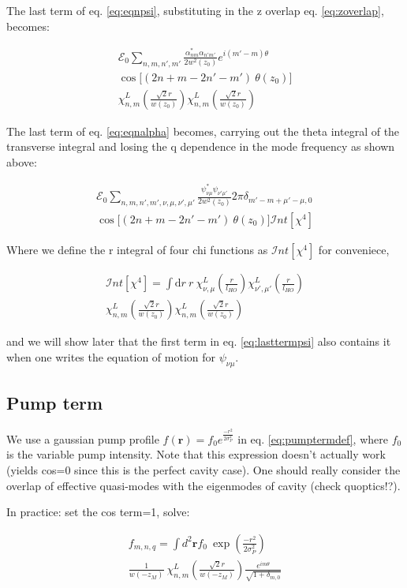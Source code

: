 \documentclass[a4paper,twocolumn,nobalancelastpage]{revtex4-1}
\newcommand{\vect}[1]{\mathbf{#1}}
\newcommand{\lho}{l_{HO}}
\newcommand{\wzsq}{w^2(z_0)}
\newcommand{\af}{\psi_{\nu\mu}}
\newcommand{\afp}{\psi_{\nu'\mu'}}
\newcommand{\lf}{\alpha_{nm}}
\newcommand{\lfp}{\alpha_{n'm'}}
\newcommand{\chiaf}{\chi_{\nu,\mu}^L\left(\frac{r}{\lho}\right)}
\newcommand{\chiafp}{\chi_{\nu',\mu'}^L\left(\frac{r}{\lho}\right)}
\newcommand{\chilf}{\chi_{n,m}^L\left(\frac{\sqrt{2}r}{w(z_0)}\right)}
\newcommand{\chilfp}{\chi_{n,m}^L\left(\frac{\sqrt{2}r}{w(z_0)}\right)}
\newcommand{\intfour}{\mathcal{I}nt[\chi^4]}
\begin{document}
The last term of eq. \eqref{eq:eqnpsi}, substituting in the z overlap eq. \eqref{eq:zoverlap}, becomes:

\begin{multline}
\label{eq:lasttermpsi}
\mathcal{E}_0 \sum_{n,m,n',m'} \frac{\lf^* \lfp}{2 \wzsq} e^{i(m'-m)\theta} 
\\ \cos \big[(2n+m-  2n'-m') 
\ \theta(z_0)\big] \\ \chilf \chilfp
\end{multline}

The last term of eq. \eqref{eq:eqnalpha} becomes, carrying out the theta integral of the transverse integral and losing the q dependence in the mode frequency as shown above:

\begin{multline}
\label{eq:lasttermalpha}
\mathcal{E}_0 \sum_{n,m,n',m', \nu, \mu, \nu',\mu'} \frac{\af^* \afp}{2 \wzsq}
2 \pi \delta_{m'-m+\mu'-\mu,0}\\
\cos \big[(2n+m-  2n'-m') 
\ \theta(z_0)\big] \intfour
\end{multline}

Where we define the r integral of four chi functions as $\mathcal{I}nt[\chi^4]$ for conveniece,

\begin{multline}
\label{eq:intfour}
\mathcal{I}nt[\chi^4]=\int \mathrm{d}r \ r \  \chiaf \chiafp \\ \chilf \chilfp
\end{multline}

and we will show later that the first term in eq. \eqref{eq:lasttermpsi} also contains it when one writes the equation of motion for $\af$.

\subsection{Pump term}

We use a gaussian pump profile $f(\vect{r})= f_0 e^{\frac{-r^2}{2\sigma_P^2}}$ in eq. \eqref{eq:pumptermdef}, where $f_0$ is the variable pump intensity. Note that this expression doesn't actually work (yields cos=0 since this is the perfect cavity case). One should really consider the overlap of effective quasi-modes with the eigenmodes of cavity (check quoptics!?).

In practice: set the cos term=1, solve:

\begin{multline}
f_{m,n,q} = \int d^2\vect{r} f_0 \ \exp \left(\frac{-r^2}{2\sigma_P^2} \right) \\ \frac{1}{w(-z_{M})} \ \chi_{n,m}^L  \left(\frac{\sqrt{2}r}{w(-z_{M})}\right) \frac{e^{im\theta}}{\sqrt{1+\delta_{m,0}}}
\end{multline}
\end{document}

